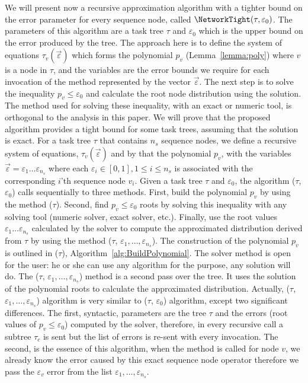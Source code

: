 \documentclass{article}
\begin{document}
We will present now a recursive approximation algorithm with a tighter bound on the error parameter 
for every sequence node, called $\NetworkTight(\tau, 
\varepsilon_0)$. The parameters of this algorithm are %
a task tree $\tau$ and 
$\varepsilon_0$ which is the upper bound on the error produced by the tree. The approach here is to 
define the system of equations $ \tau_v(\overrightarrow{\varepsilon}) $ which forms the polynomial 
$p_v$ (Lemma~\ref{lemma:poly}) where $v$ is a node in $\tau$, and the variables are the error 
bounds we require for each invocation of the \Sequence method represented by the vector 
$\overrightarrow{\varepsilon}$. The next step is to solve the inequality $p_v \leq \varepsilon_0$ and calculate the 
root node distribution using the solution. The method used for solving these inequality, with an exact or numeric tool, is orthogonal to the analysis in this paper. 
We will prove that the proposed algorithm provides a tight bound for some task trees, assuming that 
the solution is exact. 
For a task tree $\tau $ that contains $n_s$ sequence nodes, we define a recursive system of equations, $ \tau_v(\overrightarrow{\varepsilon}) $ and by that the polynomial $p_v$, with the variables $\overrightarrow{\varepsilon} =\varepsilon_1 \dots \varepsilon_{n_s}$ where each $\varepsilon_i\in [0,1],  1\leq i \leq n_s $ is associated with the corresponding $i$'th sequence node $v_i$.
Given a task tree $\tau$ and $\varepsilon_0$, the algorithm \NetworkTight($\tau$, $\varepsilon_0$) calls sequentially to three methods. First, build the polynomial $ p_v $ by using the method \BuildPolynomial($\tau$). Second, find $p_v \leq \varepsilon_0$ roots by solving this inequality with any solving tool (numeric solver, exact solver, etc.). Finally, use the root values $\varepsilon_1 \dots \varepsilon_{n_s}$ calculated by the solver to compute the approximated distribution derived from $\tau$ by using the method \CalcNetwork($\tau$, $\varepsilon_1, \dots, \varepsilon_{n_s}$).
The construction of the polynomial $p_v$ is outlined in \BuildPolynomialm($\tau$), Algorithm~\ref{alg:BuildPolynomial}. The solver method is open for the user: he or she can use any algorithm for the purpose, any solution will do. 
The \CalcNetwork($\tau$, $\varepsilon_1, \dots, \varepsilon_{n_s}$) method is a second pass over the tree. It uses the solution of the 
polynomial roots to calculate the approximated distribution. Actually, \CalcNetwork($\tau$, $\varepsilon_1, \dots, \varepsilon_{n_s}$) algorithm is very similar to \Network($\tau$, $\varepsilon_0$) algorithm, except two significant differences. The first, syntactic,  \CalcNetwork parameters are the tree $\tau$ and the errors (root values of $p_v \leq \varepsilon_0$) computed by the solver, therefore, in every recursive call a subtree $\tau_c$ is sent but the list of errors is re-sent with every invocation. The second, is the essence of this algorithm, when the \Sequence method is called for node $v$, we already know the error caused by this exact sequence node operator therefore we pass the $\varepsilon_v $ error from the list $\varepsilon_1, \dots, \varepsilon_{n_s}$.
\end{document}
